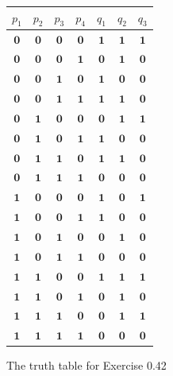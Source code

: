 \begin{figure}[tb]
\begin{center}
\begin{tabular}{cccc|ccc}
$p_1$ & $p_2$ & $p_3$ & $p_4$ & $q_1$ & $q_2$ & $q_3$\\
\hline
$\pmb{0}$ & $\pmb{0}$ & $\pmb{0}$ & $\pmb{0}$ & $\pmb{1}$ & $\pmb{1}$ & $\pmb{1}$\\
$\pmb{0}$ & $\pmb{0}$ & $\pmb{0}$ & $\pmb{1}$ & $\pmb{0}$ & $\pmb{1}$ & $\pmb{0}$\\
$\pmb{0}$ & $\pmb{0}$ & $\pmb{1}$ & $\pmb{0}$ & $\pmb{1}$ & $\pmb{0}$ & $\pmb{0}$\\
$\pmb{0}$ & $\pmb{0}$ & $\pmb{1}$ & $\pmb{1}$ & $\pmb{1}$ & $\pmb{1}$ & $\pmb{0}$\\
$\pmb{0}$ & $\pmb{1}$ & $\pmb{0}$ & $\pmb{0}$ & $\pmb{0}$ & $\pmb{1}$ & $\pmb{1}$\\
$\pmb{0}$ & $\pmb{1}$ & $\pmb{0}$ & $\pmb{1}$ & $\pmb{1}$ & $\pmb{0}$ & $\pmb{0}$\\
$\pmb{0}$ & $\pmb{1}$ & $\pmb{1}$ & $\pmb{0}$ & $\pmb{1}$ & $\pmb{1}$ & $\pmb{0}$\\
$\pmb{0}$ & $\pmb{1}$ & $\pmb{1}$ & $\pmb{1}$ & $\pmb{0}$ & $\pmb{0}$ & $\pmb{0}$\\
$\pmb{1}$ & $\pmb{0}$ & $\pmb{0}$ & $\pmb{0}$ & $\pmb{1}$ & $\pmb{0}$ & $\pmb{1}$\\
$\pmb{1}$ & $\pmb{0}$ & $\pmb{0}$ & $\pmb{1}$ & $\pmb{1}$ & $\pmb{0}$ & $\pmb{0}$\\
$\pmb{1}$ & $\pmb{0}$ & $\pmb{1}$ & $\pmb{0}$ & $\pmb{0}$ & $\pmb{1}$ & $\pmb{0}$\\
$\pmb{1}$ & $\pmb{0}$ & $\pmb{1}$ & $\pmb{1}$ & $\pmb{0}$ & $\pmb{0}$ & $\pmb{0}$\\
$\pmb{1}$ & $\pmb{1}$ & $\pmb{0}$ & $\pmb{0}$ & $\pmb{1}$ & $\pmb{1}$ & $\pmb{1}$\\
$\pmb{1}$ & $\pmb{1}$ & $\pmb{0}$ & $\pmb{1}$ & $\pmb{0}$ & $\pmb{1}$ & $\pmb{0}$\\
$\pmb{1}$ & $\pmb{1}$ & $\pmb{1}$ & $\pmb{0}$ & $\pmb{0}$ & $\pmb{1}$ & $\pmb{1}$\\
$\pmb{1}$ & $\pmb{1}$ & $\pmb{1}$ & $\pmb{1}$ & $\pmb{0}$ & $\pmb{0}$ & $\pmb{0}$
\end{tabular}
\end{center}
\caption{The truth table for Exercise 0.42}\label{fig-0.9}
\end{figure}
